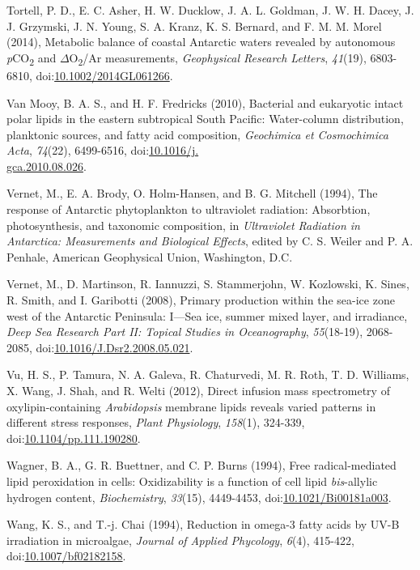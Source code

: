 \begin{singlespace}
{{Tortell, P. D., E. C. Asher, H. W. Ducklow, J. A. L. Goldman, J. W. H. Dacey, J. J. Grzymski, J. N. Young, S. A. Kranz, K. S. Bernard, and F. M. M. Morel (2014), Metabolic balance of coastal Antarctic waters revealed by autonomous \emph{p}CO\textsubscript{2} and $\Delta$O\textsubscript{2}/Ar measurements, \emph{Geophysical Research Letters}, \emph{41}(19), 6803-6810, doi:\href{http://dx.doi.org/10.1002/2014GL061266}{10.1002/2014GL061266}.

Van Mooy, B. A. S., and H. F. Fredricks (2010), Bacterial and eukaryotic intact polar lipids in the eastern subtropical South Pacific: Water-column distribution, planktonic sources, and fatty acid composition, \emph{Geochimica et Cosmochimica Acta}, \emph{74}(22), 6499-6516, doi:\href{http://dx.doi.org/10.1016/j.gca.2010.08.026}{10.1016/j.\\gca.2010.08.026}.

Vernet, M., E. A. Brody, O. Holm-Hansen, and B. G. Mitchell (1994), The response of Antarctic phytoplankton to ultraviolet radiation: Absorbtion, photosynthesis, and taxonomic composition, in \emph{Ultraviolet Radiation in Antarctica: Measurements and Biological Effects}, edited by C. S. Weiler and P. A. Penhale, American Geophysical Union, Washington, D.C.

Vernet, M., D. Martinson, R. Iannuzzi, S. Stammerjohn, W. Kozlowski, K. Sines, R. Smith, and I. Garibotti (2008), Primary production within the sea-ice zone west of the Antarctic Peninsula: I---Sea ice, summer mixed layer, and irradiance, \emph{Deep Sea Research Part II: Topical Studies in Oceanography}, \emph{55}(18-19), 2068-2085, doi:\href{http://dx.doi.org/10.1016/J.Dsr2.2008.05.021}{10.1016/J.Dsr2.2008.05.021}.

Vu, H. S., P. Tamura, N. A. Galeva, R. Chaturvedi, M. R. Roth, T. D. Williams, X. Wang, J. Shah, and R. Welti (2012), Direct infusion mass spectrometry of oxylipin-containing \emph{Arabidopsis} membrane lipids reveals varied patterns in different stress responses, \emph{Plant Physiology}, \emph{158}(1), 324-339, doi:\href{http://dx.doi.org/10.1104/pp.111.190280}{10.1104/pp.111.190280}.

Wagner, B. A., G. R. Buettner, and C. P. Burns (1994), Free radical-mediated lipid peroxidation in cells: Oxidizability is a function of cell lipid \emph{bis}-allylic hydrogen content, \emph{Biochemistry}, \emph{33}(15), 4449-4453, doi:\href{http://dx.doi.org/10.1021/Bi00181a003}{10.1021/Bi00181a003}.

Wang, K. S., and T.-j. Chai (1994), Reduction in omega-3 fatty acids by UV-B irradiation in microalgae, \emph{Journal of Applied Phycology}, \emph{6}(4), 415-422, doi:\href{http://dx.doi.org/10.1007/bf02182158}{10.1007/bf02182158}.

}}
\end{singlespace}
